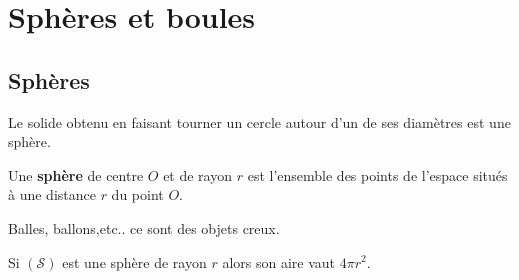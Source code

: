 \section{Sphères et boules}
\subsection{Sphères}
\begin{remarque}
    Le solide obtenu en faisant tourner un cercle autour d'un de ses diamètres est une sphère.
\end{remarque}
\begin{definition}
    Une \textbf{sphère} de centre $O$ et de rayon $r$ est l'ensemble des points de l'espace situés à une distance $r$ du point $O$.
\end{definition}
\begin{exemples*1}
    Balles, ballons,etc.. ce sont des objets creux.
\end{exemples*1}
\begin{propriete}[\admise]
    Si $(\mathscr S)$ est une sphère de rayon $r$ alors son aire vaut $4\pi r^2$.
\end{propriete}

